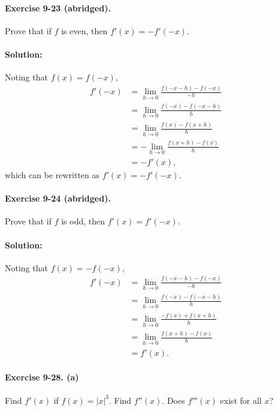 \documentclass{article}
\begin{document}
\paragraph{Exercise 9-23 (abridged).} Prove that if $f$ is even, then $f'(x) =
-f'(-x)$.

\paragraph{Solution:} Noting that $f(x) = f(-x)$, \begin{align*}
  f'(-x) &= \lim_{h \rightarrow 0}\frac{f(-x - h) - f(-x)}{-h} \\
    &= \lim_{h \rightarrow 0}\frac{f(-x) - f(-x - h)}{h} \\
    &= \lim_{h \rightarrow 0}\frac{f(x) - f(x + h)}{h} \\
    &= -\lim_{h \rightarrow 0}\frac{f(x + h) - f(x)}{h} \\
    &= -f'(x),
\end{align*} which can be rewritten as $f'(x) = -f'(-x)$.

\paragraph{Exercise 9-24 (abridged).} Prove that if $f$ is odd, then $f'(x) =
f'(-x)$.

\paragraph{Solution:} Noting that $f(x) = -f(-x)$, \begin{align*}
  f'(-x) &= \lim_{h \rightarrow 0}\frac{f(-x - h) - f(-x)}{-h} \\
    &= \lim_{h \rightarrow 0}\frac{f(-x) - f(-x - h)}{h} \\
    &= \lim_{h \rightarrow 0}\frac{-f(x) + f(x + h)}{h} \\
    &= \lim_{h \rightarrow 0}\frac{f(x + h) - f(x)}{h} \\
    &= f'(x).
\end{align*}

\paragraph{Exercise 9-28. (a)} Find $f'(x)$ if $f(x) = |x|^3$. Find $f''(x)$.
Does $f'''(x)$ exist for all $x$?
\end{document}
